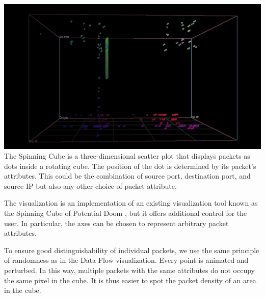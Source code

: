 \includegraphics[width=\linewidth]{materials/cube.jpg}
The Spinning Cube is a three-dimensional scatter plot that displays packets as dots inside a rotating cube. The position of the dot is determined by its packet's attributes. This could be the combination of source port, destination port, and source IP but also any other choice of packet attribute.

The visualization is an implementation of an existing visualization tool known as the Spinning Cube of Potential Doom \cite{lau2004spinning}, but it offers additional control for the user. In particular, the axes can be chosen to represent arbitrary packet attributes.

To ensure good distinguishability of individual packets, we use the same principle of randomness as in the Data Flow visualization. Every point is animated and perturbed. In this way, multiple packets with the same attributes do not occupy the same pixel in the cube. It is thus easier to spot the packet density of an area in the cube.